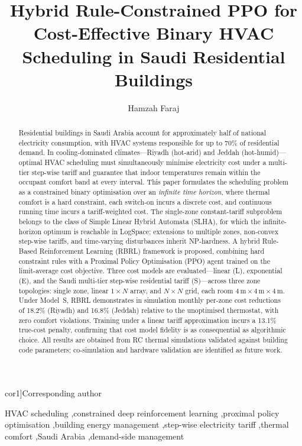 \documentclass[3p,number]{elsarticle}
\def\corref#1{}%
\def\cortext#1{}%
\begin{document}
 
\begin{frontmatter}
 
\title{Hybrid Rule-Constrained PPO for Cost-Effective Binary HVAC
Scheduling in Saudi Residential Buildings}

\author[tu]{Hamzah Faraj\corref{cor1}}
\cortext[cor1]{Corresponding author}

 
\begin{abstract}
Residential buildings in Saudi Arabia account for approximately half of national electricity consumption, with HVAC systems responsible for up to 70\% of residential demand.
In cooling-dominated climates---Riyadh (hot-arid) and Jeddah (hot-humid)---optimal HVAC scheduling must simultaneously minimise electricity cost under a multi-tier step-wise tariff and guarantee that indoor temperatures remain within the occupant comfort band at every interval.
This paper formulates the scheduling problem as a constrained binary optimisation over an \emph{infinite time horizon}, where thermal comfort is a hard constraint, each switch-on incurs a discrete cost, and continuous running time incurs a tariff-weighted cost.
The single-zone constant-tariff subproblem belongs to the class of Simple Linear Hybrid Automata (SLHA), for which the infinite-horizon optimum is reachable in LogSpace; extensions to multiple zones, non-convex step-wise tariffs, and time-varying disturbances inherit NP-hardness.
A hybrid Rule-Based Reinforcement Learning (RBRL) framework is proposed, combining hard constraint rules with a Proximal Policy Optimisation (PPO) agent trained on the limit-average cost objective.
Three cost models are evaluated---linear (L), exponential (E), and the Saudi multi-tier step-wise residential tariff (S)---across three zone topologies: single zone, linear $1\times N$ array, and $N\times N$ grid, each room $4\,\text{m}\times4\,\text{m}\times4\,\text{m}$.
Under Model~S, RBRL demonstrates in simulation monthly per-zone cost reductions of 18.2\% (Riyadh) and 16.8\% (Jeddah) relative to the unoptimised thermostat, with zero comfort violations.
Training under a linear tariff approximation incurs a 13.1\% true-cost penalty, confirming that cost model fidelity is as consequential as algorithmic choice.
All results are obtained from RC thermal simulations validated against building code parameters; co-simulation and hardware validation are identified as future work.
\end{abstract}
 
\begin{keyword}
HVAC scheduling \sep constrained deep reinforcement learning \sep proximal policy
optimisation \sep building energy management \sep step-wise electricity tariff
\sep thermal comfort \sep Saudi Arabia \sep demand-side management
\end{keyword}
 
\end{frontmatter}
 
\end{document}

